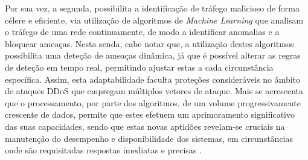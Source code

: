 Por sua vez, a segunda, possibilita a identificação de tráfego malicioso de forma célere e eficiente, via utilização de algoritmos de \textit{Machine Learning} que analisam o tráfego de uma rede continuamente, de modo a identificar anomalias e a bloquear ameaças. Nesta senda, cabe notar que, a utilização destes algoritmos possibilita uma deteção de ameaças dinâmica, já que é possível alterar as regras de deteção em tempo real, permitindo ajustar estas a cada circunstância específica. Assim, esta adaptabilidade faculta proteções consideráveis no âmbito de ataques DDoS que empregam múltiplos vetores de ataque. Mais se acrescenta que o processamento, por parte dos algoritmos, de um volume progressivamente crescente de dados, permite que estes efetuem um aprimoramento significativo das suas capacidades, sendo que estas novas aptidões revelam-se cruciais na manutenção do desempenho e disponibilidade dos sistemas, em circunstâncias onde são requisitadas respostas imediatas e precisas \cite{edgenext_ai_ddos_protection}.
